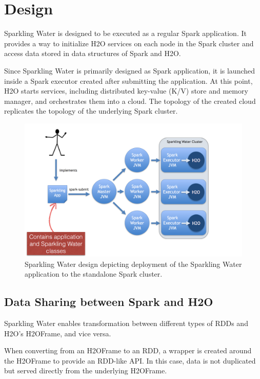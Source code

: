 \documentclass{standalone}
\begin{document}
\section{Design}
Sparkling Water is designed to be executed as a regular Spark application. It provides a way to initialize H2O services on each node in the Spark cluster and access data stored in data structures of Spark and H2O.

Since Sparkling Water is primarily designed as Spark application, it is launched
inside a Spark executor created after submitting the application. At this
point, H2O starts services, including distributed key-value (K/V) store and memory manager, and orchestrates them into a cloud. The topology of the created cloud replicates the topology of the underlying Spark cluster.

\begin{figure}[h!]
	\centering
	\includegraphics[scale=0.6]{sw/images/Topology.png}
	\caption{Sparkling Water design depicting deployment of the Sparkling Water application to the standalone Spark cluster.}
\end{figure}


\subsection{Data Sharing between Spark and H2O}

Sparkling Water enables transformation between different types of RDDs and H2O's H2OFrame, and vice versa.

When converting from an H2OFrame to an RDD, a wrapper is created around the H2OFrame to provide an RDD-like API. In this case,  data is not duplicated but served directly from the underlying H2OFrame.
\end{document}
